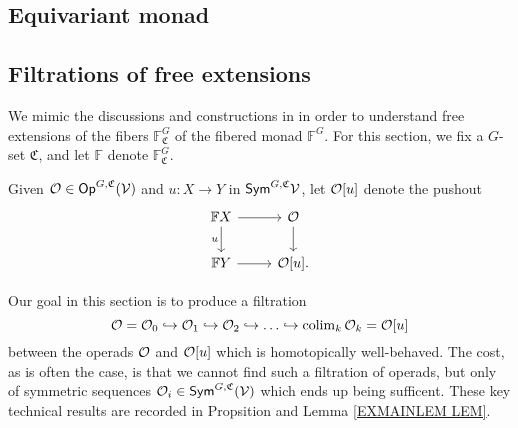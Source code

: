 \documentclass[a4paper,10pt
,draft
]{article}%
\renewcommand{\1}{\eta}%
\begin{document}
\subsection{Equivariant monad}

\subsection{Filtrations of free extensions} %

We mimic the discussions and constructions in \cite[\S 5.1 - 5.3]{BP_geo}
in order to understand free extensions of the fibers $\mathbb F^G_{\mathfrak C}$ of the fibered monad $\mathbb F^G$.
For this section, we fix a $G$-set $\mathfrak C$, and let $\mathbb F$ denote $\mathbb F^G_{\mathfrak C}$.

\begin{definition}
      Given $\mathcal{O} \in \mathsf{Op}^{G, \mathfrak C}(\mathcal V)$ and $u: X \to Y$ in $\mathsf{Sym}^{G,\mathfrak C}\mathcal V$,
      let $\mathcal {\mathcal{O}}[u]$ denote the pushout
      \begin{equation}
            \label{OU_EQ}
            \begin{tikzcd}
                  \mathbb F X \arrow[d, "u"'] \arrow[r]
                  &
                  \O \arrow[d]
                  \\
                  \mathbb F Y \arrow[r]
                  &
                  \O[u].
            \end{tikzcd}
      \end{equation}
\end{definition}

Our goal in this section is to produce a filtration
\begin{equation}
      \label{FILT_EQ}
      \O = \O_0 \into \O_1 \into \O_2 \into \dots \into \colim_k \O_k = \O[u]
\end{equation}
between the operads $\mathcal{O}$ and $\mathcal{O}[u]$
which is homotopically well-behaved.
The cost, as is often the case, is that we cannot find such a filtration of operads,
but only of symmetric sequences $\mathcal{O}_i \in \mathsf{Sym}^{G, \mathfrak C}(\mathcal V)$
which ends up being sufficent.
These key technical results are recorded in Propsition \label{FILT_PUSH_PROP} and Lemma \ref{EXMAINLEM LEM}.
\end{document}
